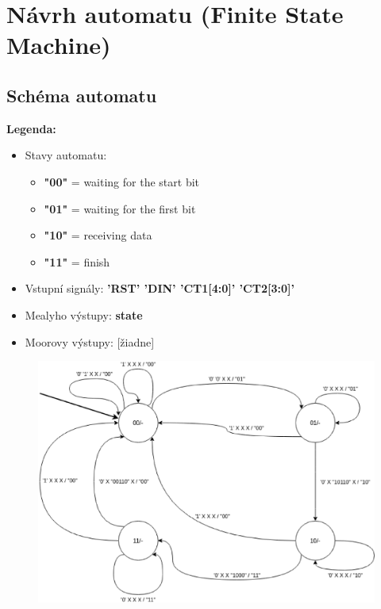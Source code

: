 \documentclass{article}
\begin{document}
\newpage


\section*{Návrh automatu (Finite State Machine)}
\bigskip

\subsection*{Schéma automatu}
\bigskip
\textbf{Legenda:}
\begin{itemize}
  \item Stavy automatu:
    \begin{itemize}
      \item \textbf{"00"} = waiting for the start bit
      \item \textbf{"01"} = waiting for the first bit
      \item \textbf{"10"} = receiving data
      \item \textbf{"11"} = finish
    \end{itemize}
  \item Vstupní signály: \textbf{'RST' 'DIN' 'CT1[4:0]' 'CT2[3:0]'}
  \item Mealyho výstupy: \textbf{state}
  \item Moorovy výstupy: [žiadne]
\end{itemize}
\vspace{1em}
\begin{figure}[h]
  \begin{center}
    \includegraphics[width=12cm]{src/diag.eps}
  \end{center}
\end{figure}
\end{document}
